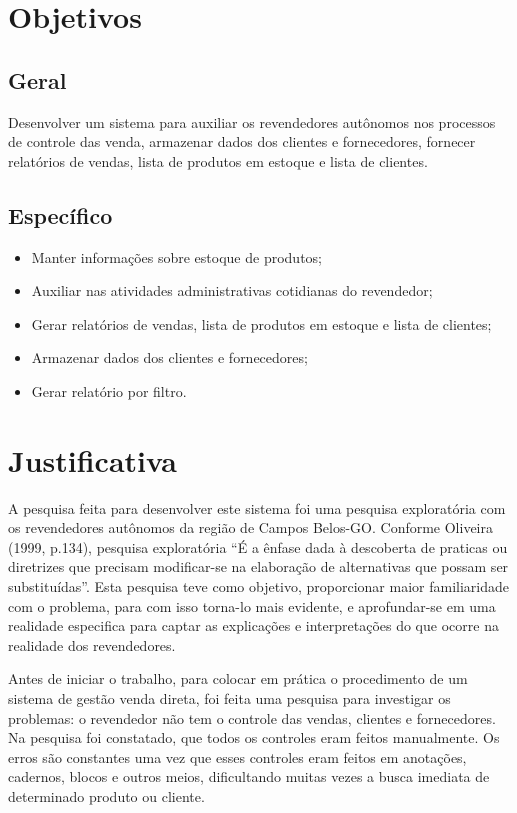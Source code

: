 \documentclass[chapter=TITLE,12pt,oneside,a4paper,english,french,sumario=tradicional,spanish,brazil,]{abntex2}
\begin{document}
\chapter{Objetivos}
\section{Geral}
Desenvolver um sistema para auxiliar os revendedores autônomos nos processos de controle das venda, armazenar dados dos clientes e fornecedores, fornecer relatórios de vendas, lista de produtos em estoque e lista de clientes.

\section{Específico}
\begin{itemize}
    \item Manter informações sobre estoque de produtos;
    \item Auxiliar nas atividades administrativas cotidianas do revendedor;
    \item Gerar relatórios de vendas, lista de produtos em estoque e lista de clientes;
    \item Armazenar dados dos clientes e fornecedores;
    \item Gerar relatório por filtro.
\end{itemize}


\chapter{Justificativa}
A pesquisa feita para desenvolver este sistema foi uma pesquisa exploratória com os revendedores autônomos da região de Campos Belos-GO. Conforme Oliveira (1999, p.134), pesquisa exploratória “É a ênfase dada à descoberta de praticas ou diretrizes que precisam modificar-se na elaboração de alternativas que possam ser substituídas”. Esta pesquisa teve como objetivo, proporcionar maior familiaridade com o problema, para com isso torna-lo mais evidente, e aprofundar-se em uma realidade especifica para captar as explicações e interpretações do que ocorre na realidade dos revendedores.

Antes de iniciar o trabalho, para colocar em prática o procedimento de um sistema de gestão venda direta, foi feita uma pesquisa para investigar os problemas: o revendedor não tem o controle das vendas, clientes e fornecedores. Na pesquisa foi constatado, que todos os controles eram feitos manualmente. Os erros são constantes uma vez que esses controles eram feitos em anotações, cadernos, blocos e outros meios, dificultando muitas vezes a busca imediata de determinado produto ou cliente.
\end{document}
